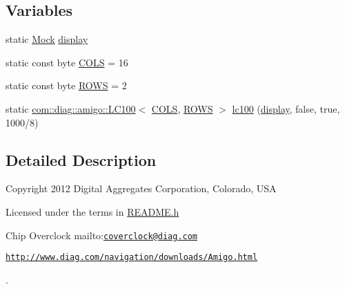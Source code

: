 \subsection*{Variables}
\begin{DoxyCompactItemize}
\item 
\hypertarget{TinyTerminal_8ino_aa69ecd18e38aaa6c48d94adc9f91f0ef}{
static \hyperlink{classMock}{Mock} \hyperlink{TinyTerminal_8ino_aa69ecd18e38aaa6c48d94adc9f91f0ef}{display}}
\label{TinyTerminal_8ino_aa69ecd18e38aaa6c48d94adc9f91f0ef}

\item 
\hypertarget{TinyTerminal_8ino_aefd90f1160eaa105bc910d4d7c46b815}{
static const byte \hyperlink{TinyTerminal_8ino_aefd90f1160eaa105bc910d4d7c46b815}{COLS} = 16}
\label{TinyTerminal_8ino_aefd90f1160eaa105bc910d4d7c46b815}

\item 
\hypertarget{TinyTerminal_8ino_a829655a147df70dd4cc94eae40a2204e}{
static const byte \hyperlink{TinyTerminal_8ino_a829655a147df70dd4cc94eae40a2204e}{ROWS} = 2}
\label{TinyTerminal_8ino_a829655a147df70dd4cc94eae40a2204e}

\item 
\hypertarget{TinyTerminal_8ino_ac147bb31e8b56903ce5c7b9224494010}{
static \hyperlink{classcom_1_1diag_1_1amigo_1_1LC100}{com::diag::amigo::LC100}$<$ \hyperlink{TinyTerminal_8ino_aefd90f1160eaa105bc910d4d7c46b815}{COLS}, \hyperlink{TinyTerminal_8ino_a829655a147df70dd4cc94eae40a2204e}{ROWS} $>$ \hyperlink{TinyTerminal_8ino_ac147bb31e8b56903ce5c7b9224494010}{lc100} (\hyperlink{TinyTerminal_8ino_aa69ecd18e38aaa6c48d94adc9f91f0ef}{display}, false, true, 1000/8)}
\label{TinyTerminal_8ino_ac147bb31e8b56903ce5c7b9224494010}

\end{DoxyCompactItemize}


\subsection{Detailed Description}
Copyright 2012 Digital Aggregates Corporation, Colorado, USA\par
 Licensed under the terms in \hyperlink{README_8h}{README.h}\par
 Chip Overclock mailto:\href{mailto:coverclock@diag.com}{\tt coverclock@diag.com}\par
 \href{http://www.diag.com/navigation/downloads/Amigo.html}{\tt http://www.diag.com/navigation/downloads/Amigo.html}\par
. 

